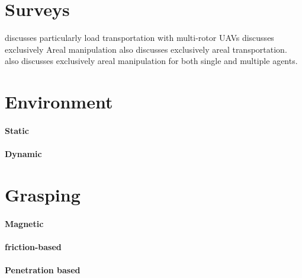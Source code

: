 \documentclass{article}
\begin{document}
	\section{Surveys}
		\cite{chung-2018-a-survey-on-aerial-swarm-robotics}
		\cite{coppola-2020-a-survey-on-swarming-with-micro-air-vehicles-fundamental-challenges-and-constraints}
		\cite{villa-2019-a-survey-on-load-transportation-using-multirotor-uavs} discusses particularly load transportation with multi-rotor UAVs 
		\cite{ruggiero-2018-introduction-to-the-special-issue-on-aerial-manipulation} discusses exclusively Areal manipulation
		\cite{tuci-2018-cooperative-object-transport-in-multi-robot-systems-a-review-of-the-state-of-the-art} also discusses exclusively areal transportation. 
		\cite{mohiuddin-2020-a-survey-of-single-and-multi-uav-aerial-manipulation} also discusses exclusively areal manipulation for both single and multiple agents. 
	\section{Environment}
		\paragraph{Static}
		\paragraph{Dynamic}
		\cite{spurny-2019-cooperative-transport-of-large-objects-by-a-pair-of-unmanned-aerial-systems-using-sampling-based-motion-planning}
		\cite{mora-2017-multi-robot-formation-control-and-object-transport-in-dynamic-environments-via-constrained-optimization}
	\section{Grasping}
		\paragraph{Magnetic}
			\cite{loianno-2017-cooperative-transportation-using-small-quadrotors-using-monocular-vision-and-inertial-sensing}
			\cite{mellinger-2010-cooperative-grasping-and-transport-using-multiple-quadrotors}
		\paragraph{friction-based}
		\paragraph{Penetration based}
\end{document}
